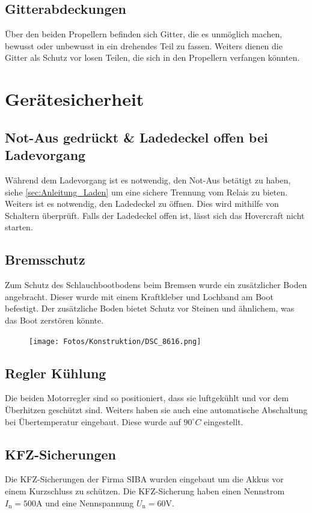 \subsection{Gitterabdeckungen}
Über den beiden Propellern befinden sich Gitter, die es unmöglich machen, bewusst oder unbewusst in ein drehendes Teil zu fassen. 
Weiters dienen die Gitter als Schutz vor losen Teilen, die sich in den Propellern verfangen könnten. 

\section{Gerätesicherheit}

\subsection{Not-Aus gedrückt \& Ladedeckel offen bei Ladevorgang}
Während dem Ladevorgang ist es notwendig, den Not-Aus betätigt zu haben, siehe \ref{sec:Anleitung_Laden} um eine sichere Trennung vom Relais zu bieten. \\
Weiters ist es notwendig, den Ladedeckel zu öffnen. Dies wird mithilfe von Schaltern überprüft. Falls der Ladedeckel offen ist, lässt sich das Hovercraft nicht starten.

\subsection{Bremsschutz}
Zum Schutz des Schlauchbootbodens beim Bremsen wurde ein zusätzlicher Boden angebracht. Dieser wurde mit einem Kraftkleber und Lochband am Boot befestigt. 
Der zusätzliche Boden bietet Schutz vor Steinen und ähnlichem, was das Boot zerstören könnte. 

\begin{figure}[h]
    \centering
    \texttt{[image: Fotos/Konstruktion/DSC\_8616.png]}
\end{figure}


\subsection{Regler Kühlung}
Die beiden Motorregler sind so positioniert, dass sie luftgekühlt und vor dem Überhitzen geschützt sind. Weiters haben sie auch eine automatische Abschaltung bei Übertemperatur
eingebaut. Diese wurde auf $90^\circ C$ eingestellt. 

\subsection{KFZ-Sicherungen}
Die KFZ-Sicherungen der Firma SIBA wurden eingebaut um die Akkus vor einem Kurzschluss zu schützen. Die KFZ-Sicherung haben einen Nennstrom $I_\mathrm{n} = 500\mathrm{A}$
und eine Nennspannung $U_\mathrm{n} = 60 \mathrm{V}$.